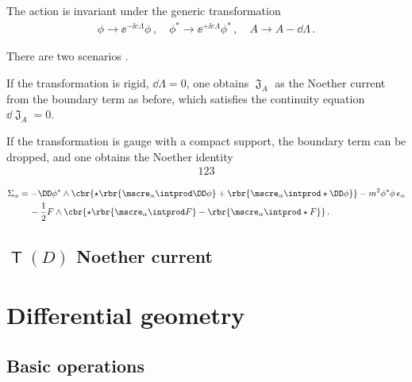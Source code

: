 \documentclass[a4paper]{article}
\begin{document}

The action is invariant under the generic transformation
\begin{align}
\phi \to \ee^{-\ii e \Lambda} \phi\,,\quad
\phi^* \to \ee^{+\ii e \Lambda} \phi^*\,,\quad
A \to A - \dd \Lambda\,.
\end{align}

There are two scenarios \cite{Avery2015}.

If the transformation is rigid, $\dd \Lambda = 0$, one obtains $\mfrakJ_A$ as 
the Noether current from the boundary term as before, which satisfies the 
continuity equation $\dd \mfrakJ_A = 0$.

If the transformation is gauge with a compact support, the boundary term can be
dropped, and one obtains the Noether identity
\begin{align}
123
\end{align}

\begin{align}
\begin{split}
\Sigma_{\alpha} &=
	-\DD\phi^* \wedge \cbr{\star\rbr{\mscre_{\alpha}\intprod \DD\phi} +
		\rbr{\mscre_{\alpha}\intprod\star\DD\phi}}
-m^2\phi^*\phi\,\epsilon_{\alpha}
\\
&\quad\,
- \frac{1}{2} F \wedge \cbr{\star\rbr{\mscre_{\alpha}\intprod F} -
		\rbr{\mscre_{\alpha}\intprod \star F}}\,.
\end{split}
\end{align}

\subsection[$T(D)$ Noether current]{$\msansT(D)$ Noether current}


\cite{Avery2015}


\appendix

\section{Differential geometry}


\subsection{Basic operations}
\end{document}
